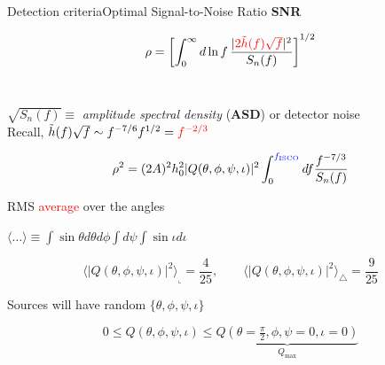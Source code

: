\documentclass[xcolor=dvipsnames,handout,t]{beamer}
\newcommand{\red}[1]{\textcolor{red}{#1}}
\newcommand{\bl}[1]{\textcolor{blue}{#1}}
\newcommand{\f}{\frac}
\begin{document}
\begin{frame}{Detection criteria}{Optimal Signal-to-Noise Ratio {\bf SNR}}
\vspace{-5mm}
\begin{footnotesize} 
\[
 \rho=\left[ \int_0^\infty d\ln f\, \f{|\red{2\tilde{h}(f)\sqrt{f}}|^2}{S_n(f)}\right]^{1/2} 
\]
\\
\end{footnotesize}
$\sqrt{S_n(f)}\equiv$ {\it amplitude spectral density} ({\bf ASD}) or  detector noise
\\
\vspace{3mm}
Recall, $\tilde{h}(f) \sqrt{f} \sim f^{-7/6} f^{1/2} = \red{f^{-2/3}}$
\begin{footnotesize} 
\[
 \rho^2 =  (2A)^2 h_0^2 |Q(\theta,\phi,\psi,\iota)|^2 \int_0^{\bl{f_\text{ISCO}}} df \f{f^{-7/3}}{S_n(f)} 
\]
\end{footnotesize}
%
RMS \red{average} over the angles 
\begin{small}
$ \langle \ldots \rangle \equiv \int \sin\theta d\theta d\phi \int d\psi \int\sin\iota d\iota $
\end{small}
\begin{footnotesize} 
\[
 \langle |Q(\theta,\phi,\psi,\iota)|^2 \rangle_\llcorner = \f{4}{25}, \qquad \langle |Q(\theta,\phi,\psi,\iota)|^2 \rangle_\triangle = \f{9}{25}
\]
\end{footnotesize}
%
Sources will have random $\{\theta,\phi,\psi,\iota\}$ \\
\begin{footnotesize} 
\[
0 \le Q(\theta,\phi,\psi,\iota) \le \underbrace{Q(\theta=\tfrac{\pi}{2},\phi,\psi=0,\iota=0)}_{Q_\text{max}}
\]
\end{footnotesize}
% 
\end{frame}
\end{document}
